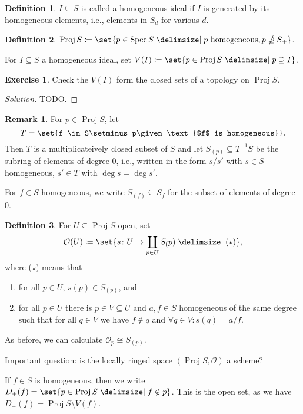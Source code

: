\documentclass[a4paper]{amsbook}
\theoremstyle{definition}
\newtheorem{remark}[definition]{Remark}
\newtheorem*{definition*}{Definition}
\newtheorem*{exercise*}{Exercise}
\DeclareMathOperator\Spec{Spec}
\DeclareMathOperator\Proj{Proj}
\begin{document}
\begin{definition*}
\label{HomogeneousIdeal}
$I \subseteq S$ is called a homogeneous ideal if $I$ is generated by its
homogeneous elements, i.e., elements in $S_d$ for various $d$.
\end{definition*}

\begin{definition*}
\label{Proj}
$\Proj S\coloneqq \set{p \in \Spec S\given p\text{ homogeneous}, p\nsupseteq S_+}$.

For $I \subseteq S$ a homogeneous ideal, set $V(I)\coloneqq \set{p \in \Proj S\given p\supseteq I}$.
\end{definition*}

\begin{exercise*}
\label{ProjectiveZariski}
Check the $V(I)$ form the closed sets of a topology on $\Proj S$.
\end{exercise*}
\begin{proof}[Solution]
TODO.
\end{proof}

\begin{remark}
\label{HomogenousNotation}
For $p \in \Proj S$, let
\[ T = \set{f \in S\setminus p\given \text{$f$ is homogeneous}}. \]
Then $T$ is a multiplicateively closed subset of $S$ and let $S_{(p)} \subseteq T^{-1}S$
be the subring of elements of degree $0$, i.e., written in the form $s/s'$ with
$s \in S$ homogeneous, $s' \in T$ with $\deg s = \deg s'$.

For $f \in S$ homogeneous, we write $S_(f) \subseteq S_f$ for the subset of
elements of degree $0$.
\end{remark}

\begin{definition*}
\label{ProjectiveStructureSheaf}
For $U \subseteq \Proj S$ open, set
\[ \mathcal{O}(U)\coloneqq \set{s\colon U\to \coprod_{p \in U} S_(p)\given (\star)}, \]
where ($\star$) means that
\begin{enumerate}
	\item for all  $p \in U$, $s(p) \in S_(p)$, and
	\item for all $p \in U$ there is $p \in V \subseteq U$ and $a, f \in S$ homogeneous
		of the same degree such that for all $q \in V$ we have $f \notin q$
		and $\forall q \in V\colon s(q) = a/f$.
\end{enumerate}

As before, we can calculate $\mathcal{O}_p \cong S_{(p)}$.

Important question: is the locally ringed space $(\Proj S, \mathcal{O})$ a
scheme?

If $f \in S$ is homogeneous, then we write $D_+(f) = \set{p \in \Proj S\given f\notin p}$.
This is the open set, as we have $D_+(f) = \Proj S\setminus V(f)$.
\end{definition*}
\end{document}
